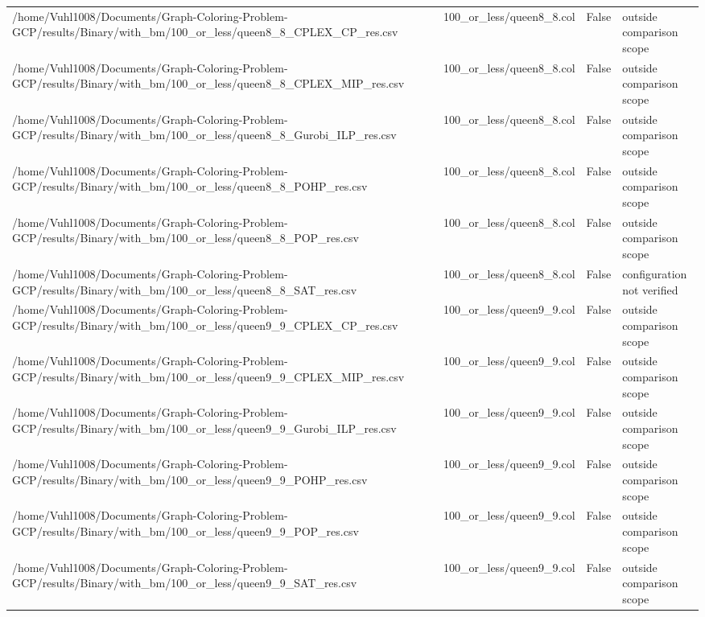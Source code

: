 \begin{table}[htbp]
\begin{tabular}{llll}
/home/Vuhl1008/Documents/Graph-Coloring-Problem-GCP/results/Binary/with\_bm/100\_or\_less/queen8\_8\_CPLEX\_CP\_res.csv & 100\_or\_less/queen8\_8.col & False & outside comparison scope \\
/home/Vuhl1008/Documents/Graph-Coloring-Problem-GCP/results/Binary/with\_bm/100\_or\_less/queen8\_8\_CPLEX\_MIP\_res.csv & 100\_or\_less/queen8\_8.col & False & outside comparison scope \\
/home/Vuhl1008/Documents/Graph-Coloring-Problem-GCP/results/Binary/with\_bm/100\_or\_less/queen8\_8\_Gurobi\_ILP\_res.csv & 100\_or\_less/queen8\_8.col & False & outside comparison scope \\
/home/Vuhl1008/Documents/Graph-Coloring-Problem-GCP/results/Binary/with\_bm/100\_or\_less/queen8\_8\_POHP\_res.csv & 100\_or\_less/queen8\_8.col & False & outside comparison scope \\
/home/Vuhl1008/Documents/Graph-Coloring-Problem-GCP/results/Binary/with\_bm/100\_or\_less/queen8\_8\_POP\_res.csv & 100\_or\_less/queen8\_8.col & False & outside comparison scope \\
/home/Vuhl1008/Documents/Graph-Coloring-Problem-GCP/results/Binary/with\_bm/100\_or\_less/queen8\_8\_SAT\_res.csv & 100\_or\_less/queen8\_8.col & False & configuration not verified \\
/home/Vuhl1008/Documents/Graph-Coloring-Problem-GCP/results/Binary/with\_bm/100\_or\_less/queen9\_9\_CPLEX\_CP\_res.csv & 100\_or\_less/queen9\_9.col & False & outside comparison scope \\
/home/Vuhl1008/Documents/Graph-Coloring-Problem-GCP/results/Binary/with\_bm/100\_or\_less/queen9\_9\_CPLEX\_MIP\_res.csv & 100\_or\_less/queen9\_9.col & False & outside comparison scope \\
/home/Vuhl1008/Documents/Graph-Coloring-Problem-GCP/results/Binary/with\_bm/100\_or\_less/queen9\_9\_Gurobi\_ILP\_res.csv & 100\_or\_less/queen9\_9.col & False & outside comparison scope \\
/home/Vuhl1008/Documents/Graph-Coloring-Problem-GCP/results/Binary/with\_bm/100\_or\_less/queen9\_9\_POHP\_res.csv & 100\_or\_less/queen9\_9.col & False & outside comparison scope \\
/home/Vuhl1008/Documents/Graph-Coloring-Problem-GCP/results/Binary/with\_bm/100\_or\_less/queen9\_9\_POP\_res.csv & 100\_or\_less/queen9\_9.col & False & outside comparison scope \\
/home/Vuhl1008/Documents/Graph-Coloring-Problem-GCP/results/Binary/with\_bm/100\_or\_less/queen9\_9\_SAT\_res.csv & 100\_or\_less/queen9\_9.col & False & outside comparison scope \\

\end{tabular}
\end{table}
